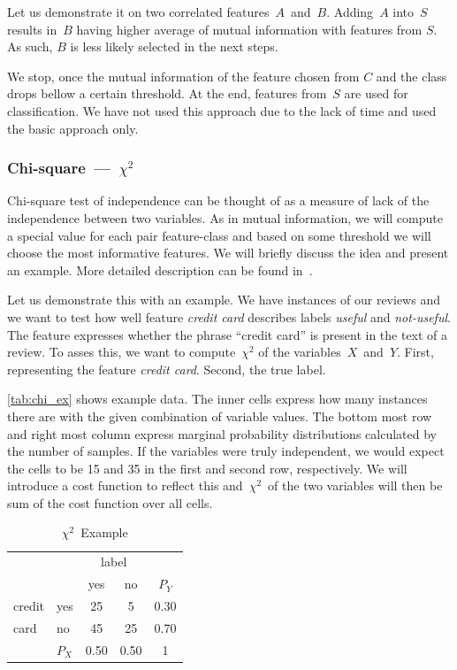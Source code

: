 Let us demonstrate it on two correlated features~$A$~and~$B$.
Adding~$A$ into~$S$ results in~$B$ having higher average of mutual information with features from $S$.
As such, $B$ is less likely selected in the next steps.

We stop, once the mutual information of the feature chosen from $C$ and the class drops bellow a certain
threshold.
At the end, features from~$S$ are used for classification.
We have not used this approach due to the lack of time and used the basic approach only.



\subsubsection{Chi-square~---~$\chi^2$}

Chi-square test of independence can be thought of
as a measure of lack of the independence between two variables.
As in mutual information,
we will compute a special value for each pair feature-class
and based on some threshold we will choose the most informative features.
We will briefly discuss the idea and present an example.
More detailed description can be found in~\citet{Hugh13}.


Let us demonstrate this with an example.
We have instances of our reviews and we want to test how well
feature \textit{credit card} describes
labels \textit{useful} and \textit{not-useful}.
The feature expresses whether the phrase ``credit card'' is present in the text of a review.
To asses this, we want to compute~$\chi^2$ of the variables~$X$~and~$Y$.
First, representing the feature \textit{credit card}.
Second, the true label.

\autoref{tab:chi_ex} shows example data.
The inner cells express how many instances there are with the given combination of variable values.
The bottom most row and right most column express marginal probability distributions
calculated by the number of samples.
If the variables were truly independent,
we would expect the cells to be 15 and 35 in the first and second row, respectively.
We will introduce a cost function to reflect this
and~$\chi^2$~of the two variables will then be sum of the cost function over all cells.


\begin{table}[h!]
 \center
 \begin{tabular}{|l|l|c|c|c}
 \cline{3-4}
        &       & \multicolumn{2}{c|}{label} & \\
        \cline{3-4}
        &       & yes        & no            & $P_Y$ \\
        \cline{1-4}
 credit & yes   & 25         & 5             & 0.30 \\
        \cline{2-4}
 card   & no    & 45         & 25            & 0.70 \\
        \cline{1-4}
        & $P_X$ & 0.50       & 0.50          & 1
 
 \end{tabular}
 \caption{$\chi^2$~Example}
 \label{tab:chi_ex}
\end{table}

